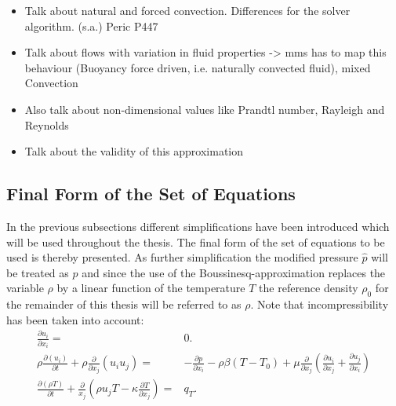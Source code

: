       \begin{itemize}
        \item Talk about natural and forced convection. Differences for the solver algorithm. (s.a.) Peric P447
        \item Talk about flows with variation in fluid properties -> mms has to map this behaviour (Buoyancy force driven, i.e. naturally convected fluid), mixed Convection
        \item Also talk about non-dimensional values like Prandtl number, Rayleigh and Reynolds
        \item Talk about the validity of this approximation
      \end{itemize}
      
    \subsection{Final Form of the Set of Equations}

    In the previous subsections different simplifications have been introduced which will be used throughout the thesis. The final form of the set of equations to be used is thereby presented. As further simplification the modified pressure \(\hat{p}\) will be treated as \(p\) and since the use of the Boussinesq-approximation replaces the variable \(\rho\) by a linear function of the temperature \(T\) the reference density \(\rho_0\) for the remainder of this thesis will be referred to as \(\rho\). Note that incompressibility has been taken into account:
    \begin{subequations}
      \label{eq:completeset}
    \begin{align}
      \label{eq:contidiff}
      \frac{\partial u_i}{\partial x_i} =& 0. \\[1em]
      \label{eq:momentumdiff}
        \rho \frac{\partial \left( u_i \right)}{\partial t} 
        + \rho \frac{\partial}{\partial x_j} \left( u_i  u_j \right) 
        =& - \frac{\partial p}{\partial x_i} 
        - \rho \beta \left( T - T_0 \right)
        +  \mu \frac{\partial}{\partial x_j} \left( \frac{\partial u_i}{\partial x_j} 
        + \frac{\partial u_j}{\partial x_i} \right) \\[1em]
    \label{eq:temperaturediff}
    \frac{\partial \left(\rho T \right)}{\partial t} + \frac{\partial}{x_j} \left( \rho u_j T - \kappa \frac{\partial T}{\partial x_j} \right) =& q_T.
    \end{align}
  \end{subequations}
